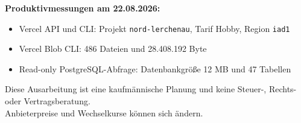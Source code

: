 \documentclass[11pt,a4paper]{article}
\begin{document}
\textbf{Produktivmessungen am 22.08.2026:}

\begin{itemize}
  \item Vercel API und CLI: Projekt \texttt{nord-lerchenau}, Tarif Hobby, Region \texttt{iad1}
  \item Vercel Blob CLI: 486 Dateien und 28.408.192 Byte
  \item Read-only PostgreSQL-Abfrage: Datenbankgröße 12 MB und 47 Tabellen
\end{itemize}

\vfill
\begin{center}
  \sffamily\footnotesize\color{NordMuted}
  Diese Ausarbeitung ist eine kaufmännische Planung und keine Steuer-, Rechts- oder Vertragsberatung.\\
  Anbieterpreise und Wechselkurse können sich ändern.
\end{center}
\end{document}
